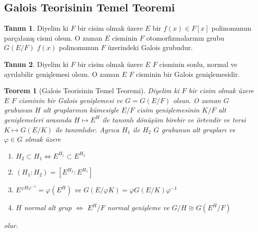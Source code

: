 \documentclass{article}
\newtheorem{thm}{Teorem}[section]
\theoremstyle{definition}
\newtheorem{defn}{Tanım}[section]
\theoremstyle{remark}
\begin{document}
    	\subsection{Galois Teorisinin Temel Teoremi}
    	
    	    \begin{defn}
    	        Diyelim ki $F$ bir cisim olmak üzere $E$ bir $f(x) \in F[x]$ polinomunun parçalanış cismi olsun. O zaman $E$ cisminin $F$ otomorfizmalarının grubu $G(E/F)$ $f(x)$ polinomunun $F$ üzerindeki Galois grubudur.
    	    \end{defn}
    	    
    	    \begin{defn}
    	        Diyelim ki $F$ bir cisim olmak üzere $E$ $F$ cisminin sonlu, normal ve ayrılabilir genişlemesi olsun. O zaman $E$ $F$ cisminin bir Galois genişlemesidir.
    	    \end{defn}
    	    
    	    \begin{thm}[Galois Teorisinin Temel Teoremi]
    	        Diyelim ki $F$ bir cisim olmak üzere $E$ $F$ cisminin bir Galois genişlemesi ve $G = G(E/F)$ olsun. O zaman $G$ grubunun $H$ alt gruplarının kümesiyle $E/F$ cisim genişlemesinin $K/F$ alt genişlemeleri arasında $H \mapsto E^H$ ile tanımlı dönüşüm birebir ve örtendir ve tersi $K \mapsto G(E/K)$ ile tanımlıdır. Ayrıca $H_1$ ile $H_2$ $G$ grubunun alt grupları ve $\varphi \in G$ olmak üzere
    	        \begin{enumerate}
    				\renewcommand{\labelenumi}{(\roman{enumi})}
    				\item $H_2 \subset H_1 \iff E^{H_1} \subset E^{H_2}$
    				\item $(H_1 : H_2) = [E^{H_2} : E^{H_1}]$
    				\item $E^{\varphi H \varphi^{-1}} = \varphi(E^H)$ ve $G(E/\varphi K) = \varphi G(E/K) \varphi^{-1}$
    				\item $H$ normal alt grup $\iff$ $E^H/F$ normal genişleme ve $G/H \cong G(E^H/F)$
    			\end{enumerate}
    	        olur.
    	    \end{thm}
    	    
\end{document}
